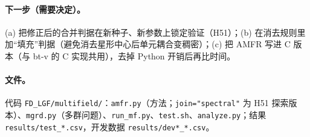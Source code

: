 \documentclass[11pt,a4paper]{ctexart}
\begin{document}
\paragraph{下一步（需要决定）。}
(a) 把修正后的合并判据在新种子、新参数上锁定验证（H51）；(b) 在消去规则里加“填充”判据（避免消去星形中心后单元耦合变稠密）；(c) 把 AMFR 写进 C 版本（与 bt-v 的 C 实现共用），去掉 Python 开销后再比时间。

\paragraph{文件。} \sloppy 代码 \texttt{FD\_LGF/multifield/}：\texttt{amfr.py}（方法；\texttt{join="spectral"} 为 H51 探索版本）、\texttt{mgrd.py}（多群问题）、\texttt{run\_mf.py}、\texttt{test.sh}、\texttt{analyze.py}；结果 \texttt{results/test\_*.csv}，开发数据 \texttt{results/dev*\_*.csv}。
\end{document}
